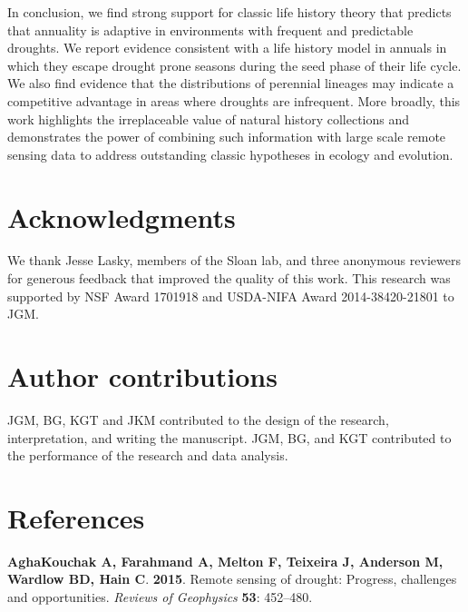 \documentclass[man,floatsintext]{apa6}
\theoremstyle{definition}
\theoremstyle{definition}
\theoremstyle{definition}
\theoremstyle{remark}
\begin{document}
In conclusion, we find strong support for classic life history theory
that predicts that annuality is adaptive in environments with frequent
and predictable droughts. We report evidence consistent with a life
history model in annuals in which they escape drought prone seasons
during the seed phase of their life cycle. We also find evidence that
the distributions of perennial lineages may indicate a competitive
advantage in areas where droughts are infrequent. More broadly, this
work highlights the irreplaceable value of natural history collections
and demonstrates the power of combining such information with large
scale remote sensing data to address outstanding classic hypotheses in
ecology and evolution.

\hypertarget{acknowledgments}{%
\section{Acknowledgments}\label{acknowledgments}}

We thank Jesse Lasky, members of the Sloan lab, and three anonymous
reviewers for generous feedback that improved the quality of this work.
This research was supported by NSF Award 1701918 and USDA-NIFA Award
2014-38420-21801 to JGM.

\hypertarget{author-contributions}{%
\section{Author contributions}\label{author-contributions}}

JGM, BG, KGT and JKM contributed to the design of the research,
interpretation, and writing the manuscript. JGM, BG, and KGT contributed
to the performance of the research and data analysis.

\hypertarget{references}{%
\section{References}\label{references}}

\begingroup
\setlength{\parindent}{-0.5in}
\setlength{\leftskip}{0.5in}

\hypertarget{refs}{}
\leavevmode\hypertarget{ref-aghakouchak2015remote}{}%
\textbf{\textnormal{AghaKouchak A}, \textnormal{Farahmand A},
\textnormal{Melton F}, \textnormal{Teixeira J}, \textnormal{Anderson M},
\textnormal{Wardlow BD}, \textnormal{Hain C}}. \textbf{2015}. Remote
sensing of drought: Progress, challenges and opportunities.
\emph{Reviews of Geophysics} \textbf{53}: 452--480.
\end{document}
